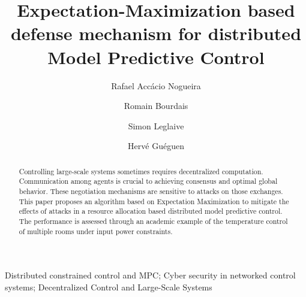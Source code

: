 \documentclass{ifacconf}  %
\begin{document}
\begin{frontmatter}
\title{\LARGE \bf
  Expectation-Maximization based defense mechanism for distributed Model Predictive Control
}

\author[First]{Rafael Accácio Nogueira}
\author[First]{Romain Bourdais}
\author[First]{Simon Leglaive}
\author[First]{Hervé Guéguen}
\address[First]{IETR-CentraleSupélec, 35510 Cesson-Sévigné, Ille-et-Vilaine, France\\
{\tt\small \{rafael-accacio.nogueira, romain.bourdais, simon.leglaive, herve.gueguen\}
@centralesupelec.fr}}




\begin{abstract}%
  Controlling large-scale systems sometimes requires decentralized computation.
  Communication among agents is crucial to achieving consensus and optimal global behavior.
  These negotiation mechanisms are sensitive to attacks on those exchanges.
  This paper proposes an algorithm based on Expectation Maximization to mitigate the effects of attacks in a resource allocation based distributed model predictive control.
  The performance is assessed through an academic example of the temperature control of multiple rooms under input power constraints.
\end{abstract}

\begin{keyword}
Distributed constrained control and MPC;
Cyber security in networked control systems;
Decentralized Control and Large-Scale Systems
\end{keyword}

\end{frontmatter}
\end{document}
